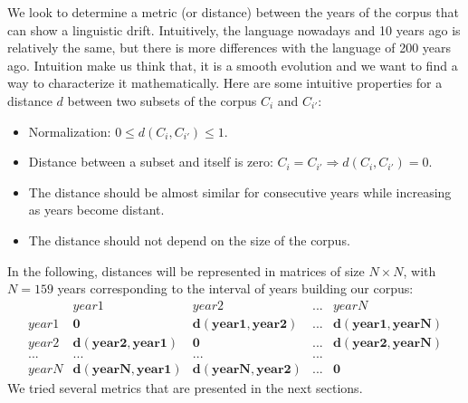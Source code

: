 
We look to determine a metric (or distance) between the years of the corpus that can show a linguistic drift. Intuitively, the language nowadays and 10 years ago is relatively the same, but there is more differences with the language of 200 years ago. Intuition make us think that, it is a smooth evolution and we want to find a way to characterize it mathematically. Here are some intuitive properties for a distance $d$ between two subsets of the corpus $C_i$ and $C_{i'}$:

\begin{itemize}
 \item Normalization: $0 \leq d(C_i,C_{i'}) \leq 1$.
 \item Distance between a subset and itself is zero: $C_i = C_{i'} \Rightarrow d(C_i,C_{i'}) = 0$.
 \item The distance should be almost similar for consecutive years while increasing as years become distant.
 \item The distance should not depend on the size of the corpus.
\end{itemize}

In the following, distances will be represented in matrices of size $N \times N$, with $N = 159$ years corresponding to the interval of years building our corpus:
\[
\begin{matrix}
 & year1 & year2 & ... & yearN \\
 year1 & \mathbf{0} & \mathbf{d(year1,year2)} & ... & \mathbf{d(year1,yearN)} \\
 year2 & \mathbf{d(year2,year1)} & \mathbf{0} & ... & \mathbf{d(year2,yearN)} \\
 ... & ... & ... & ... \\
 yearN & \mathbf{d(yearN,year1)} & \mathbf{d(yearN,year2)} & ... & \mathbf{0}
\end{matrix}
\]
We tried several metrics that are presented in the next sections.
